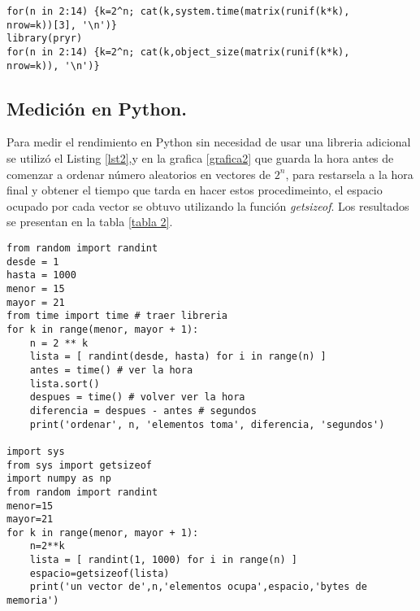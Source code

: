 \documentclass{article}
\begin{document}
\lstset{language=Python}
\lstset{frame=lines}
\lstset{basicstyle=\footnotesize}
\begin{lstlisting}
for(n in 2:14) {k=2^n; cat(k,system.time(matrix(runif(k*k),
nrow=k))[3], '\n')}
library(pryr)
for(n in 2:14) {k=2^n; cat(k,object_size(matrix(runif(k*k),
nrow=k)), '\n')}
\end{lstlisting}


\subsection{Medición en Python.} 
Para medir el rendimiento en Python sin necesidad de usar una libreria adicional se utilizó el Listing \ref{lst2},y en la grafica \ref{grafica2} que guarda la hora antes de comenzar a ordenar número aleatorios en vectores de $2^n$, para restarsela a la hora final y obtener el tiempo que tarda en hacer estos procedimeinto, el espacio ocupado por cada vector se obtuvo utilizando la función \emph{getsizeof}. Los resultados se presentan en la tabla \ref{tabla 2}.
\lstset{language=Python}
\lstset{frame=lines}
\lstset{basicstyle=\footnotesize}
\begin{lstlisting}
from random import randint
desde = 1
hasta = 1000
menor = 15
mayor = 21
from time import time # traer libreria
for k in range(menor, mayor + 1):
    n = 2 ** k
    lista = [ randint(desde, hasta) for i in range(n) ]
    antes = time() # ver la hora
    lista.sort()
    despues = time() # volver ver la hora
    diferencia = despues - antes # segundos
    print('ordenar', n, 'elementos toma', diferencia, 'segundos')
    
import sys
from sys import getsizeof
import numpy as np
from random import randint
menor=15
mayor=21
for k in range(menor, mayor + 1):
    n=2**k
    lista = [ randint(1, 1000) for i in range(n) ]
    espacio=getsizeof(lista)
    print('un vector de',n,'elementos ocupa',espacio,'bytes de memoria')
\end{lstlisting}
\end{document}
